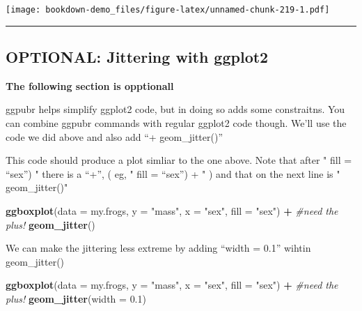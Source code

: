 \documentclass[]{book}
\newenvironment{Shaded}{\begin{snugshade}}{\end{snugshade}}
\newcommand{\KeywordTok}[1]{\textcolor[rgb]{0.13,0.29,0.53}{\textbf{#1}}}
\newcommand{\DataTypeTok}[1]{\textcolor[rgb]{0.13,0.29,0.53}{#1}}
\newcommand{\FloatTok}[1]{\textcolor[rgb]{0.00,0.00,0.81}{#1}}
\newcommand{\StringTok}[1]{\textcolor[rgb]{0.31,0.60,0.02}{#1}}
\newcommand{\CommentTok}[1]{\textcolor[rgb]{0.56,0.35,0.01}{\textit{#1}}}
\newcommand{\OperatorTok}[1]{\textcolor[rgb]{0.81,0.36,0.00}{\textbf{#1}}}
\newcommand{\NormalTok}[1]{#1}
\theoremstyle{definition}
\theoremstyle{definition}
\theoremstyle{definition}
\theoremstyle{remark}
\begin{document}
\texttt{[image: bookdown-demo\_files/figure-latex/unnamed-chunk-219-1.pdf]}

\begin{center}\rule{0.5\linewidth}{\linethickness}\end{center}

\subsection{OPTIONAL: Jittering with
ggplot2}\label{optional-jittering-with-ggplot2}

\textbf{The following section is opptionall}

ggpubr helps simplify ggplot2 code, but in doing so adds some
constraitns. You can combine ggpubr commands with regular ggplot2 code
though. We'll use the code we did above and also add ``+
geom\_jitter()''

This code should produce a plot simliar to the one above. Note that
after " fill = ``sex'') " there is a ``+'', ( eg, " fill = ``sex'') + "
) and that on the next line is " geom\_jitter()"

\begin{Shaded}
\begin{Highlighting}[]
\KeywordTok{ggboxplot}\NormalTok{(}\DataTypeTok{data =}\NormalTok{ my.frogs,}
          \DataTypeTok{y =} \StringTok{"mass"}\NormalTok{,}
          \DataTypeTok{x =} \StringTok{"sex"}\NormalTok{,}
          \DataTypeTok{fill =} \StringTok{"sex"}\NormalTok{) }\OperatorTok{+}\StringTok{  }\CommentTok{#need the plus!}
\StringTok{  }\KeywordTok{geom_jitter}\NormalTok{()}
\end{Highlighting}
\end{Shaded}

We can make the jittering less extreme by adding ``width = 0.1'' wihtin
geom\_jitter()

\begin{Shaded}
\begin{Highlighting}[]
\KeywordTok{ggboxplot}\NormalTok{(}\DataTypeTok{data =}\NormalTok{ my.frogs,}
          \DataTypeTok{y =} \StringTok{"mass"}\NormalTok{,}
          \DataTypeTok{x =} \StringTok{"sex"}\NormalTok{,}
          \DataTypeTok{fill =} \StringTok{"sex"}\NormalTok{) }\OperatorTok{+}\StringTok{  }\CommentTok{#need the plus!}
\StringTok{  }\KeywordTok{geom_jitter}\NormalTok{(}\DataTypeTok{width =} \FloatTok{0.1}\NormalTok{)}
\end{Highlighting}
\end{Shaded}
\end{document}

